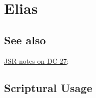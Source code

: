 \section{Elias}
	\label{ELIAS}
	
\subsection{See also}

	\hyperref[EXSS-DC27-JSR]{JSR notes on DC 27}; 





\subsection{Scriptural Usage} %
	\label{ELIAS-SCRIPTURES}

	
	
